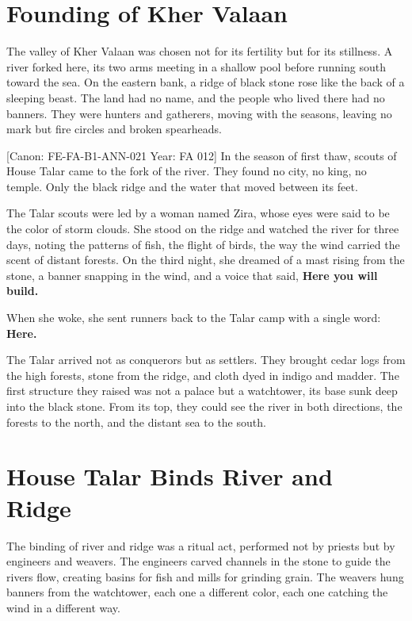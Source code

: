 \section{Founding of Kher Valaan}\label{founding-of-kher-valaan}

The valley of Kher Valaan was chosen not for its fertility but for its
stillness. A river forked here, its two arms meeting in a shallow pool
before running south toward the sea. On the eastern bank, a ridge of
black stone rose like the back of a sleeping beast. The land had no
name, and the people who lived there had no banners. They were hunters
and gatherers, moving with the seasons, leaving no mark but fire circles
and broken spearheads.

{[}Canon: FE-FA-B1-ANN-021 \textbar{} Year: FA 012{]} In the season of
first thaw, scouts of House Talar came to the fork of the river. They
found no city, no king, no temple. Only the black ridge and the water
that moved between its feet.

The Talar scouts were led by a woman named Zira, whose eyes were said to
be the color of storm clouds. She stood on the ridge and watched the
river for three days, noting the patterns of fish, the flight of birds,
the way the wind carried the scent of distant forests. On the third
night, she dreamed of a mast rising from the stone, a banner snapping in
the wind, and a voice that said, \textbf{Here you will build.}

When she woke, she sent runners back to the Talar camp with a single
word: \textbf{Here.}

The Talar arrived not as conquerors but as settlers. They brought cedar
logs from the high forests, stone from the ridge, and cloth dyed in
indigo and madder. The first structure they raised was not a palace but
a watchtower, its base sunk deep into the black stone. From its top,
they could see the river in both directions, the forests to the north,
and the distant sea to the south.

\section{House Talar Binds River and
Ridge}\label{house-talar-binds-river-and-ridge}

The binding of river and ridge was a ritual act, performed not by
priests but by engineers and weavers. The engineers carved channels in
the stone to guide the river\textquotesingle s flow, creating basins for
fish and mills for grinding grain. The weavers hung banners from the
watchtower, each one a different color, each one catching the wind in a
different way.

